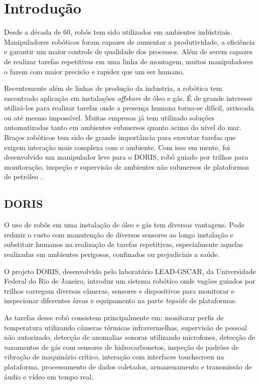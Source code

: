 \chapter{Introdução}

Desde a década de 60, robôs tem sido utilizados em ambientes indústriais. Manipuladores robóticos foram capazes de aumentar a produtividade, a eficiência e garantir um maior controle de qualidade dos processos. Além de serem capazes de realizar tarefas repetitivas em uma linha de montagem, muitos manipuladores o fazem com maior precisão e rapidez que um ser humano. 

Recentemente além de linhas de produção da industria, a robótica tem encontrado aplicação em instalações \textit{offshore} de óleo e gás. É de grande interesse utilizá-los para realizar tarefas onde a presença humana torna-se difícil, arriscada ou até mesmo impossível. Muitas empresas já tem utilizado soluções automatizadas tanto em ambientes submersos quanto acima do nível do mar. Braços robóticos tem sido de grande importância para executar tarefas que exigem interação mais complexa com o ambiente. Com isso em mente, foi desenvolvido um manipulador leve para o DORIS, robô guiado por trilhos para monitoração, inspeção e supervisão de ambientes não submersos de plataformas de petróleo \citep{xaud2016doris}.

\section{DORIS}
O uso de robôs em uma instalação de óleo e gás tem diversas vantagens. Pode reduzir o custo com manutenção de diversos sensores ao longo instalação e substituir humanos na realização de tarefas repetitivas, especialmente aquelas realizadas em ambientes perigosos, confinados ou prejudiciais a saúde. 

O projeto DORIS, desenvolvido pelo laboratório LEAD-GSCAR, da Universidade Federal do Rio de Janeiro, introduz um sistema robótico onde vagões guiados por trilhos carregam diversas câmeras, sensores e dispositivos para monitorar e inspecionar diferentes áreas e equipamento na parte \textit{topside} de plataformas.

As tarefas desse robô consistem principalmente em: monitorar perfis de temperatura utilizando câmeras térmicas infravermelhas, supervisão de pessoal não autorizado, detecção de anomalias sonoras utilizando microfones, detecção de vazamentos de gás com sensores de hidrocarbonetos, inspeção de padrões de vibração de maquinário crítico, interação com interfaces touchscreen na plataforma, processamento de dados coletados, armazenamento e transmissão de áudio e vídeo em tempo real.

